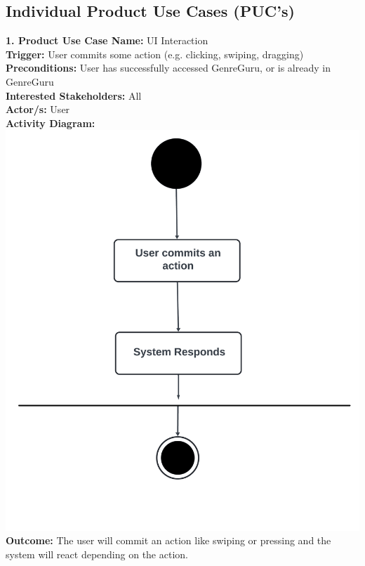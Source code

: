 \documentclass[12pt]{article}
\begin{document}
\subsection{Individual Product Use Cases (PUC's)}
\textbf{1. Product Use Case Name:} UI Interaction \\
\textbf{Trigger:} User commits some action (e.g. clicking, swiping, dragging) \\
\textbf{Preconditions:} User has successfully accessed GenreGuru, or is already in GenreGuru \\
\textbf{Interested Stakeholders:} All \\
\textbf{Actor/s:} User \\
\textbf{Activity Diagram:} \\
\includegraphics[width=\textwidth]{UI.png} \\
\textbf{Outcome:} The user will commit an action like swiping or pressing and the system will react depending on the action.

\vspace{1cm}
\end{document}
